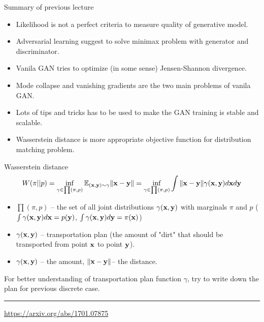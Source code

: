 

\begin{frame}
\titlepage
\end{frame}
\begin{frame}{Summary of previous lecture}
\begin{itemize}
	\item Likelihood is not a perfect criteria to measure quality of generative model.
	\item Adversarial learning suggest to solve minimax problem with generator and discriminator.
	\item Vanila GAN tries to optimize (in some sense) Jensen-Shannon divergence.
	\item Mode collapse and vanishing gradients are the two main problems of vanila GAN.
	\item Lots of tips and tricks has to be used to make the GAN training is stable and scalable.
	\item Wasserstein distance is more appropriate objective function for distribution matching problem.
\end{itemize}
\end{frame}
\begin{frame}{Wasserstein distance}
	\[
	W(\pi || p) = \inf_{\gamma \in \prod(\pi, p)} \mathbb{E}_{(\mathbf{x}, \mathbf{y}) \sim \gamma} \| \mathbf{x} - \mathbf{y} \| =  \inf_{\gamma \in \prod(\pi, p)} \int \| \mathbf{x} - \mathbf{y} \| \gamma (\mathbf{x}, \mathbf{y}) d \mathbf{x} d \mathbf{y}
	\]
	\begin{itemize}
		\item $\prod(\pi, p)$ -- the set of all joint distributions $\gamma (\mathbf{x}, \mathbf{y})$ with marginals $\pi$ and $p$ ($\int \gamma(\mathbf{x}, \mathbf{y}) d \mathbf{x} = p(\mathbf{y})$, $\int \gamma(\mathbf{x}, \mathbf{y}) d \mathbf{y} = \pi(\mathbf{x})$)
		\item $\gamma(\mathbf{x}, \mathbf{y})$ -- transportation plan (the amount of "dirt" that should be transported from point $\mathbf{x}$ to point $\mathbf{y}$).
		\item $\gamma(\mathbf{x}, \mathbf{y})$ -- the amount, $\|\mathbf{x} - \mathbf{y} \|$-- the distance.
	\end{itemize}
	For better understanding of transportation plan function $\gamma$, try to write down the plan for previous discrete case.
	\vfill
	\hrule\medskip 
	{\scriptsize \href{https://arxiv.org/abs/1701.07875}{https://arxiv.org/abs/1701.07875}}
\end{frame}
